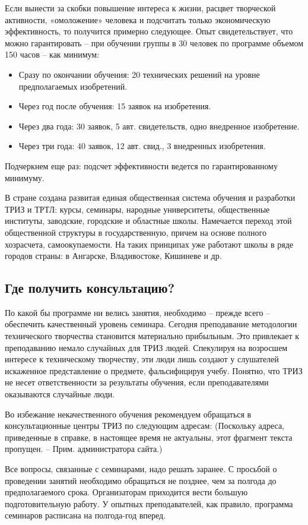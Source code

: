 \documentclass[11pt,a4paper]{article}
\begin{document}
Если вынести за скобки повышение интереса к жизни, расцвет творческой
активности, «омоложение» человека и подсчитать только экономическую
эффективность, то получится примерно следующее. Опыт свидетельствует, что
можно гарантировать -- при обучении группы в 30 человек по программе объемом
150 часов -- как минимум:
\begin{itemize}[noitemsep]
\item Сразу по окончании обучения: 20 технических решений на уровне
  предполагаемых изобретений.
\item Через год после обучения: 15 заявок на изобретения.
\item Через два года: 30 заявок, 5 авт. свидетельств, одно внедренное
  изобретение.
\item Через три года: 40 заявок, 12 авт. свид., 3 внедренных изобретения.
\end{itemize}
Подчеркнем еще раз: подсчет эффективности ведется по гарантированному минимуму.

В стране создана развитая единая общественная система обучения и разработки
ТРИЗ и ТРТЛ: курсы, семинары, народные университеты, общественные институты,
заводские, городские и областные школы. Намечается переход этой общественной
структуры в государственную, причем на основе полного хозрасчета,
самоокупаемости. На таких принципах уже работают школы в ряде городов страны:
в Ангарске, Владивостоке, Кишиневе и др.

\subsection{Где получить консультацию?}

По какой бы программе ни велись занятия, необходимо -- прежде всего --
обеспечить качественный уровень семинара. Сегодня преподавание методологии
технического творчества становится материально прибыльным. Это привлекает к
преподаванию немало случайных для ТРИЗ людей. Спекулируя на возросшем интересе
к техническому творчеству, эти люди лишь создают у слушателей искаженное
представление о предмете, фальсифицируя учебу. Понятно, что ТРИЗ не несет
ответственности за результаты обучения, если преподавателями оказываются
случайные люди.

Во избежание некачественного обучения рекомендуем обращаться в
консультационные центры ТРИЗ по следующим адресам: (Поскольку адреса,
приведенные в справке, в настоящее время не актуальны, этот фрагмент текста
пропущен. -- Прим. администратора сайта.)

Все вопросы, связанные с семинарами, надо решать заранее. С просьбой о
проведении занятий необходимо обращаться не позднее, чем за полгода до
предполагаемого срока. Организаторам приходится вести большую подготовительную
работу. У опытных преподавателей, как правило, программа семинаров расписана
на полгода-год вперед.
\end{document}
